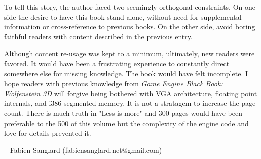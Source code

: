 \par
 To tell this story, the author faced two seemingly orthogonal constraints. On one side the desire to have this book stand alone, without need for supplemental information or cross-reference to previous books. On the other side, avoid boring faithful readers with content described in the previous entry.\\
\par
Although content re-usage was kept to a minimum, ultimately, new readers were favored. It would have been a frustrating experience to constantly direct somewhere else for missing knowledge. The book would have felt incomplete. I hope readers with previous knowledge from \textit{Game Engine Black Book: Wolfenstein 3D} will forgive being bothered with VGA architecture, floating point internals, and i386 segmented memory. It is not a stratagem to increase the page count. There is much truth in "Less is more" and 300 pages would have been preferable to the 500 of this volume but the complexity of the engine code and love for details prevented it.\\
\par
-- Fabien Sanglard (fabiensanglard.net@gmail.com)